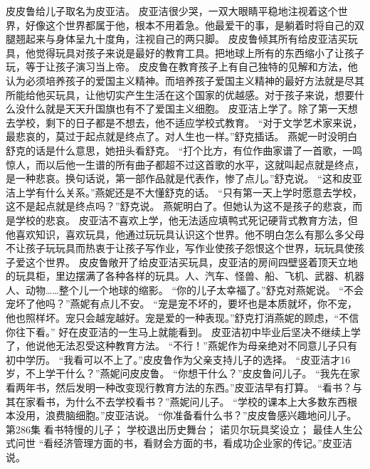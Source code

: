 \documentclass[a4paper,12pt,UTF8,twoside]{ctexbook}
\begin{document}
        皮皮鲁给儿子取名为皮亚洁。  
        皮亚洁很少哭，一双大眼睛平稳地注视着这个世界，好像这个世界都属于他，根本不用着急。他最爱干的事，是躺着时将自己的双腿翘起来与身体呈九十度角，注视自己的两只脚。  
        皮皮鲁倾其所有给皮亚洁买玩具，他觉得玩具对孩子来说是最好的教育工具。把地球上所有的东西缩小了让孩子玩，等于让孩子演习当上帝。  
        皮皮鲁在教育孩子上有自己独特的见解和方法，他认为必须培养孩子的爱国主义精神。而培养孩子爱国主义精神的最好方法就是尽其所能给他买玩具，让他切实产生生活在这个国家的优越感。对于孩子来说，想要什么没什么就是天天升国旗也有不了爱国主义细胞。  
        皮亚洁上学了。除了第一天想去学校，剩下的日子都是不想去，他不适应学校式教育。  
        “对于文学艺术家来说，最悲哀的，莫过于起点就是终点了。对人生也一样。”舒克插话。  
        燕妮一时没明白舒克的话是什么意思，她扭头看舒克。  
        “打个比方，有位作曲家谱了一首歌，一鸣惊人，而以后他一生谱的所有曲子都超不过这首歌的水平，这就叫起点就是终点，是一种悲哀。换句话说，第一部作品就是代表作，惨了点儿。”舒克说。  
        “这和皮亚洁上学有什么关系。”燕妮还是不大懂舒克的话。  
        “只有第一天上学时愿意去学校，这不是起点就是终点吗？”舒克说。  
        燕妮明白了。但她认为这不是孩子的悲哀，而是学校的悲哀。  
        皮亚洁不喜欢上学，他无法适应填鸭式死记硬背式教育方法，但他喜欢知识，喜欢玩具，他通过玩玩具认识这个世界。他不明白怎么有那么多父母不让孩子玩玩具而热衷于让孩子写作业，写作业使孩子怨恨这个世界，玩玩具使孩子爱这个世界。  
        皮皮鲁敞开了给皮亚洁买玩具，皮亚洁的房间四壁竖着顶天立地的玩具柜，里边摆满了各种各样的玩具。人、汽车、怪兽、船、飞机、武器、机器人、动物……整个儿一个地球的缩影。        
        “你的儿子太幸福了。”舒克对燕妮说。  
        “不会宠坏了他吗？”燕妮有点儿不安。  
        “宠是宠不坏的，要坏也是本质就坏，你不宠，他也照样坏。宠只会越宠越好。宠是爱的一种表现。”舒克打消燕妮的顾虑，“不信你往下看。”  
        好在皮亚洁的一生马上就能看到。  
        皮亚洁初中毕业后坚决不继续上学了，他说他无法忍受这种教育方法。  
        “不行！”燕妮作为母亲绝对不同意儿子只有初中学历。  
        “我看可以不上了。”皮皮鲁作为父亲支持儿子的选择。  
        “皮亚洁才16岁，不上学干什么？”燕妮问皮皮鲁。  
        “你想干什么？”皮皮鲁问儿子。  
        “我先在家看两年书，然后发明一种改变现行教育方法的东西。”皮亚洁早有打算。  
        “看书？与其在家看书，为什么不去学校看书？”燕妮问儿子。  
        “学校的课本上大多数东西根本没用，浪费脑细胞。”皮亚洁说。  
        “你准备看什么书？”皮皮鲁感兴趣地问儿子。          第286集  
        看书特慢的儿子；  
        学校退出历史舞台；  
        诺贝尔玩具奖设立；  
        最佳人生公式问世    
        “看经济管理方面的书，看财会方面的书，看成功企业家的传记。”皮亚洁说。  
\end{document}

